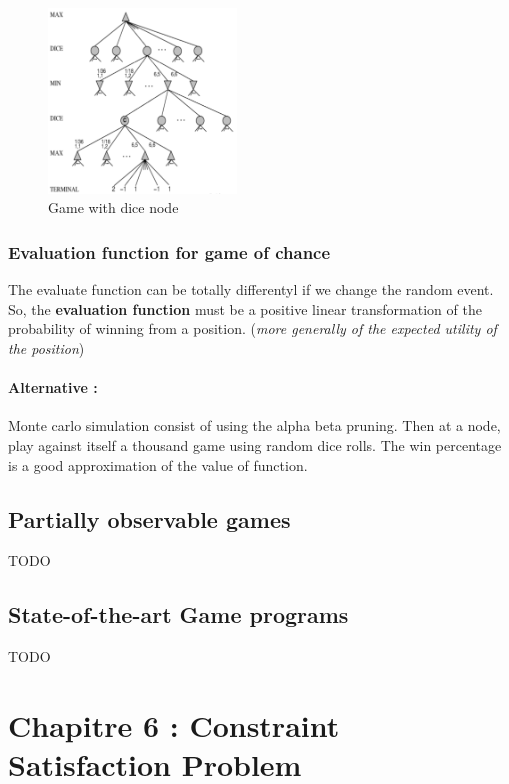\begin{figure}[h]
    \centering
    \includegraphics[width=5cm]{stochastic.png}
    \caption{Game with dice node}
\end{figure}


\subsubsection{Evaluation  function for  game  of  chance} 

The  evaluate function  can  be  totally differentyl  if  we change  the
random event.  So, the \textbf{evaluation  function} must be  a positive
linear transformation  of the  probability of  winning from  a position.
(\textit{more generally of the expected utility of the position})

\paragraph{Alternative :} Monte carlo simulation
consist of using the alpha beta pruning. Then at a node,  play against itself a thousand game using random 
dice rolls. The win percentage is a good approximation of the value of function. 



\subsection{Partially observable games}
TODO %

\subsection{State-of-the-art Game programs}
TODO%


\section{Chapitre 6 : Constraint Satisfaction Problem }

